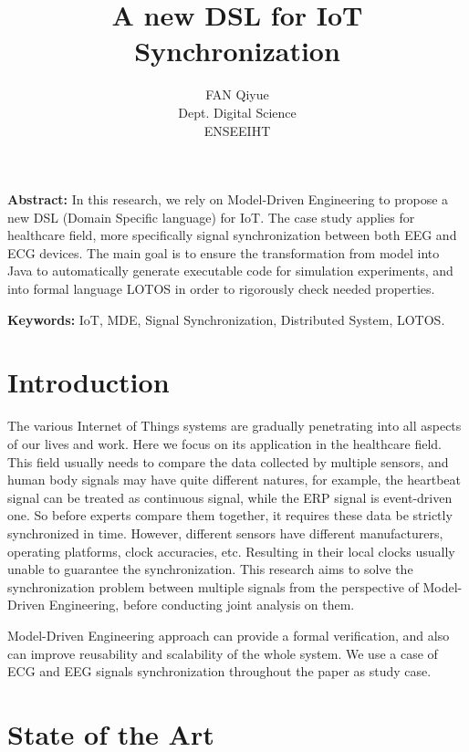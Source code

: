 \documentclass[11pt, oneside]{article}   	%
\title{\bf A new DSL for IoT Synchronization}
\author{\sffamily FAN Qiyue\\{\sffamily\small Dept. Digital Science}\\{\sffamily\small ENSEEIHT}}
\date{}							%
\begin{document}
\maketitle

{\noindent\small{\bf Abstract:} In this research, we rely on Model-Driven Engineering to propose a new DSL (Domain Specific language) for IoT. The case study applies for healthcare field, more specifically signal synchronization between both EEG and ECG devices. The main goal is to ensure the transformation from model into Java to automatically generate executable code for simulation experiments, and into formal language LOTOS in order to rigorously check needed properties.}

\vspace{1ex}
{\noindent\small{\bf Keywords:}
    IoT, MDE, Signal Synchronization, Distributed System, LOTOS.}



\section{Introduction}
\indent \par The various Internet of Things systems are gradually penetrating into all aspects of our lives and work. Here we focus on its application in the healthcare field. This field usually needs to compare the data collected by multiple sensors, and human body signals may have quite different natures, for example, the heartbeat signal can be treated as continuous signal, while the ERP signal is event-driven one. So before experts compare them together, it requires these data be strictly synchronized in time. However, different sensors have different manufacturers, operating platforms, clock accuracies, etc. Resulting in their local clocks usually unable to guarantee the synchronization. This research aims to solve the synchronization problem between multiple signals from the perspective of Model-Driven Engineering, before conducting joint analysis on them.\par
\indent \par Model-Driven Engineering approach can provide a formal verification, and also can improve reusability and scalability of the whole system. We use a case of ECG and EEG signals synchronization throughout the paper as study case.\par

\section{State of the Art}
\end{document}
